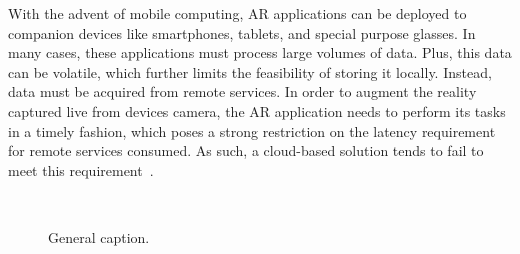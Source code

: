 With the advent of mobile computing, AR applications can be deployed to companion devices like smartphones, tablets, and special purpose glasses. In many cases, these applications must process large volumes of data. Plus, this data can be volatile, which further limits the feasibility of storing it locally. Instead, data must be acquired from remote services. In order to augment the reality captured live from devices camera, the AR application needs to perform its tasks in a timely fashion, which poses a strong restriction on the latency requirement for remote services consumed. As such, a cloud-based solution tends to fail to meet this requirement~\cite{ServerlessEdgeESOCC17}. 



\begin{figure}[tbp]
	\centering
	\hfill
	~
	\hfill
	\caption{General caption.} \label{fig:1}
\end{figure}

